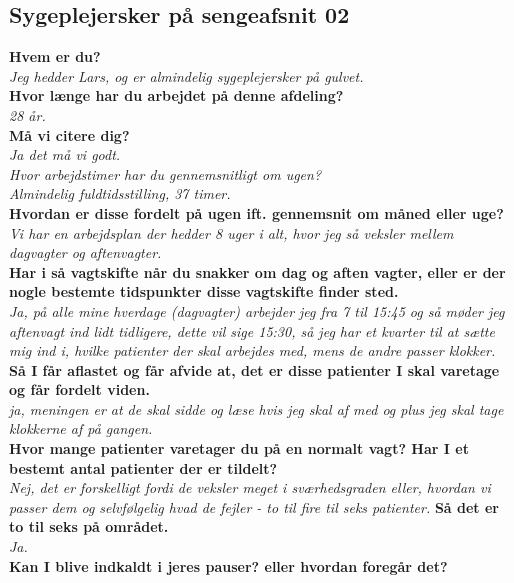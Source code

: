 \subsection{Sygeplejersker på sengeafsnit 02} \label{bilagO2}
\textbf{Hvem er du?}\\
\noindent
\textit{Jeg hedder Lars, og er almindelig sygeplejersker på gulvet.}\\
\noindent
\textbf{Hvor længe har du arbejdet på denne afdeling?} \\
\noindent
\textit{28 år.}\\
\noindent
\textbf{Må vi citere dig?}\\
\noindent
\textit{Ja det må vi godt.}\\
\noindent
\textit{Hvor arbejdstimer har du gennemsnitligt om ugen?}\\
\noindent
\textit{ Almindelig fuldtidsstilling, 37 timer.}\\
\noindent
\textbf{Hvordan er disse fordelt på ugen ift. gennemsnit om måned eller uge?}\\
\noindent
\textit{Vi har en arbejdsplan der hedder 8 uger i alt, hvor jeg så veksler mellem dagvagter og aftenvagter.}\\
\noindent
\textbf{Har i så vagtskifte når du snakker om dag og aften vagter, eller er der nogle bestemte tidspunkter disse vagtskifte finder sted.}\\
\noindent
\textit{Ja, på alle mine hverdage (dagvagter) arbejder jeg fra 7 til 15:45 og så møder jeg aftenvagt ind lidt tidligere, dette vil sige 15:30, så jeg har et kvarter til at sætte mig ind i, hvilke patienter der skal arbejdes med, mens de andre passer klokker.}\\
\noindent
\textbf{Så I får aflastet og får afvide at, det er disse patienter I skal varetage og får fordelt viden.}\\
\noindent
\textit{ja, meningen er at de skal sidde og læse hvis jeg skal af med og plus jeg skal tage klokkerne af på gangen.}\\
\noindent
\textbf{Hvor mange patienter varetager du på en normalt vagt? Har I et bestemt antal patienter der er tildelt?}\\
\noindent
\textit{ Nej, det er forskelligt fordi de veksler meget i sværhedsgraden eller, hvordan vi passer dem og selvfølgelig hvad de fejler - to til fire til seks patienter.}
\textbf{ Så det er to til seks på området.}\\
\noindent
\textit{Ja.}\\
\noindent
\textbf{Kan I blive indkaldt i jeres pauser? eller hvordan foregår det?}\\

